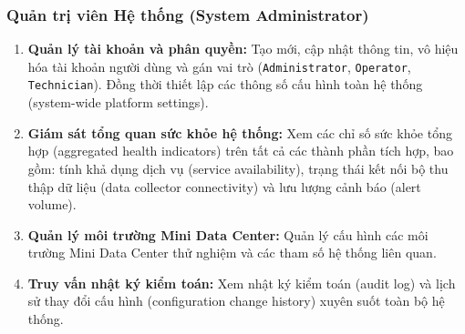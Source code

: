 \subsubsection{Quản trị viên Hệ thống (System Administrator)}
\begin{enumerate}[label=\textbf{FA-\arabic*}., leftmargin=2.5em]
    \item \textbf{Quản lý tài khoản và phân quyền:} Tạo mới, cập nhật thông tin, vô hiệu hóa tài khoản người dùng và gán vai trò (\texttt{Administrator}, \texttt{Operator}, \texttt{Technician}). Đồng thời thiết lập các thông số cấu hình toàn hệ thống (system-wide platform settings).
    \item \textbf{Giám sát tổng quan sức khỏe hệ thống:} Xem các chỉ số sức khỏe tổng hợp (aggregated health indicators) trên tất cả các thành phần tích hợp, bao gồm: tính khả dụng dịch vụ (service availability), trạng thái kết nối bộ thu thập dữ liệu (data collector connectivity) và lưu lượng cảnh báo (alert volume).
    \item \textbf{Quản lý môi trường Mini Data Center:} Quản lý cấu hình các môi trường Mini Data Center thử nghiệm và các tham số hệ thống liên quan.
    \item \textbf{Truy vấn nhật ký kiểm toán:} Xem nhật ký kiểm toán (audit log) và lịch sử thay đổi cấu hình (configuration change history) xuyên suốt toàn bộ hệ thống.
\end{enumerate}

